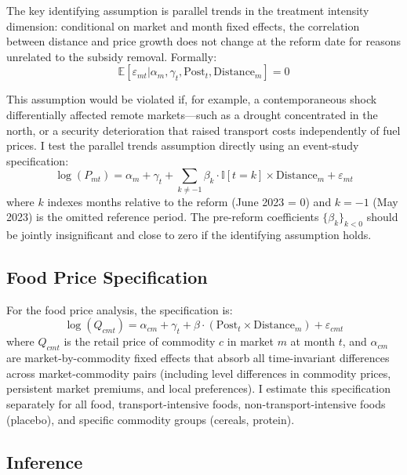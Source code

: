 \documentclass[12pt]{article}
\newcommand{\E}{\mathbb{E}}
\newcommand{\ind}{\mathbb{I}}
\begin{document}
The key identifying assumption is parallel trends in the treatment intensity dimension: conditional on market and month fixed effects, the correlation between distance and price growth does not change at the reform date for reasons unrelated to the subsidy removal. Formally:
\begin{equation}
    \E[\varepsilon_{mt} | \alpha_m, \gamma_t, \text{Post}_t, \text{Distance}_m] = 0
    \label{eq:exogeneity}
\end{equation}

This assumption would be violated if, for example, a contemporaneous shock differentially affected remote markets---such as a drought concentrated in the north, or a security deterioration that raised transport costs independently of fuel prices. I test the parallel trends assumption directly using an event-study specification:
\begin{equation}
    \log(P_{mt}) = \alpha_m + \gamma_t + \sum_{k \neq -1} \beta_k \cdot \ind[t = k] \times \text{Distance}_m + \varepsilon_{mt}
    \label{eq:event}
\end{equation}
where $k$ indexes months relative to the reform (June 2023 = 0) and $k = -1$ (May 2023) is the omitted reference period. The pre-reform coefficients $\{\beta_k\}_{k<0}$ should be jointly insignificant and close to zero if the identifying assumption holds.

\subsection{Food Price Specification}

For the food price analysis, the specification is:
\begin{equation}
    \log(Q_{cmt}) = \alpha_{cm} + \gamma_t + \beta \cdot (\text{Post}_t \times \text{Distance}_m) + \varepsilon_{cmt}
    \label{eq:food_spec}
\end{equation}
where $Q_{cmt}$ is the retail price of commodity $c$ in market $m$ at month $t$, and $\alpha_{cm}$ are market-by-commodity fixed effects that absorb all time-invariant differences across market-commodity pairs (including level differences in commodity prices, persistent market premiums, and local preferences). I estimate this specification separately for all food, transport-intensive foods, non-transport-intensive foods (placebo), and specific commodity groups (cereals, protein).

\subsection{Inference}
\end{document}
